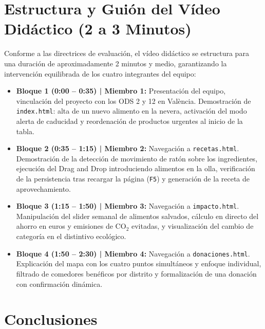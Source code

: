 \documentclass[11pt,a4paper]{article}
\begin{document}
\section{Estructura y Guión del Vídeo Didáctico (2 a 3 Minutos)}

Conforme a las directrices de evaluación, el vídeo didáctico se estructura para una duración de aproximadamente 2 minutos y medio, garantizando la intervención equilibrada de los cuatro integrantes del equipo:

\begin{itemize}
    \item \textbf{Bloque 1 (0:00 -- 0:35) | Miembro 1:}
    Presentación del equipo, vinculación del proyecto con los ODS 2 y 12 en València. Demostración de \texttt{index.html}: alta de un nuevo alimento en la nevera, activación del modo alerta de caducidad y reordenación de productos urgentes al inicio de la tabla.
    
    \item \textbf{Bloque 2 (0:35 -- 1:15) | Miembro 2:}
    Navegación a \texttt{recetas.html}. Demostración de la detección de movimiento de ratón sobre los ingredientes, ejecución del Drag and Drop introduciendo alimentos en la olla, verificación de la persistencia tras recargar la página (\texttt{F5}) y generación de la receta de aprovechamiento.
    
    \item \textbf{Bloque 3 (1:15 -- 1:50) | Miembro 3:}
    Navegación a \texttt{impacto.html}. Manipulación del slider semanal de alimentos salvados, cálculo en directo del ahorro en euros y emisiones de CO$_2$ evitadas, y visualización del cambio de categoría en el distintivo ecológico.
    
    \item \textbf{Bloque 4 (1:50 -- 2:30) | Miembro 4:}
    Navegación a \texttt{donaciones.html}. Explicación del mapa con los cuatro puntos simultáneos y enfoque individual, filtrado de comedores benéficos por distrito y formalización de una donación con confirmación dinámica.
\end{itemize}

\section{Conclusiones}
\end{document}

